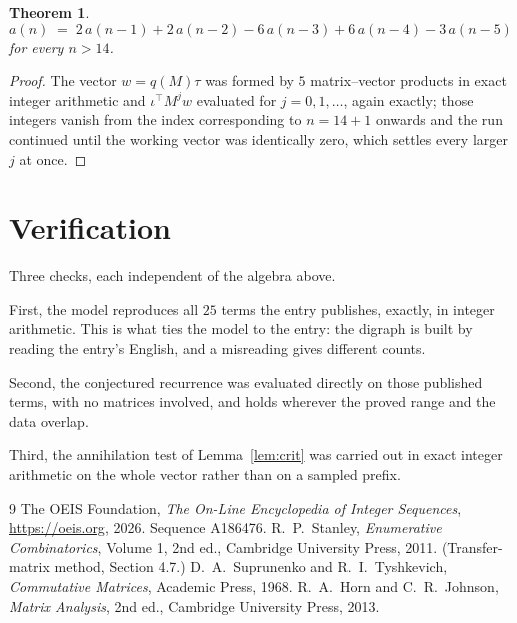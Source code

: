 \documentclass[11pt,a4paper]{article}
\theoremstyle{plain}
\newtheorem{theorem}{Theorem}
\theoremstyle{definition}
\begin{document}
\begin{theorem}
\[
a(n)\;=\;2\,a(n-1) + 2\,a(n-2) - 6\,a(n-3) + 6\,a(n-4) - 3\,a(n-5)
\]
for every $n>14$.
\end{theorem}

\begin{proof}
The vector $w=q(M)\tau$ was formed by $5$ matrix--vector products in exact integer
arithmetic and $\iota^{\!\top}M^{j}w$ evaluated for $j=0,1,\dots$, again exactly; those
integers vanish from the index corresponding to $n=14+1$ onwards and the run continued
until the working vector was identically zero, which settles every larger $j$ at once.
\end{proof}

\section{Verification}

Three checks, each independent of the algebra above.

First, the model reproduces all $25$ terms the entry publishes, exactly, in integer
arithmetic. This is what ties the model to the entry: the digraph is built by reading the
entry's English, and a misreading gives different counts.

Second, the conjectured recurrence was evaluated directly on those published terms, with no
matrices involved, and holds wherever the proved range and the data overlap.

Third, the annihilation test of Lemma~\ref{lem:crit} was carried out in exact integer
arithmetic on the whole vector rather than on a sampled prefix.

\begin{thebibliography}{9}
 The OEIS Foundation, \emph{The On-Line Encyclopedia of Integer
Sequences}, \url{https://oeis.org}, 2026. Sequence A186476.
 R.~P.~Stanley, \emph{Enumerative Combinatorics}, Volume 1, 2nd ed.,
Cambridge University Press, 2011. (Transfer-matrix method, Section 4.7.)
 D.~A.~Suprunenko and R.~I.~Tyshkevich, \emph{Commutative Matrices},
Academic Press, 1968.
 R.~A.~Horn and C.~R.~Johnson, \emph{Matrix Analysis}, 2nd ed., Cambridge
University Press, 2013.
\end{thebibliography}
\end{document}
